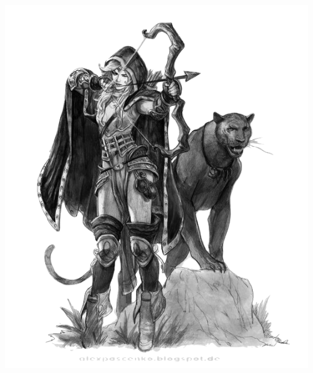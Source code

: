 \begin{multicols*}{2}
\begin{Figure}
\centering
\includegraphics[width=\textwidth]{img/hunter-panther.png}
\end{Figure}
    
\end{multicols*}    